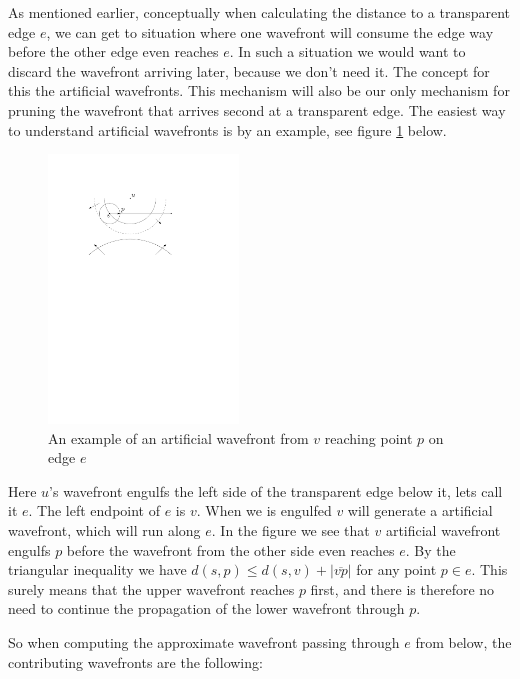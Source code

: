 As mentioned earlier, conceptually when calculating the distance to a transparent edge $e$, we 
can get to situation where one wavefront will consume the edge way before the other edge even 
reaches $e$. In such a situation we would want to discard the wavefront arriving later, 
because we don't need it. The concept for this the artificial wavefronts. This mechanism will 
also be our only mechanism for pruning the wavefront that arrives second at a transparent 
edge. The easiest way to understand artificial wavefronts is by an example, see figure 
\ref{fig:artificialwavefront} below.

\begin{figure}[H]
	\centering
	\includegraphics[width=0.45\textwidth]{figures/artificialwavefront.pdf}
	\caption{An example of an artificial wavefront from $v$ reaching point $p$ on edge $e$}
	\label{fig:artificialwavefront}
\end{figure}

Here $u$'s wavefront engulfs the left side of the transparent edge below it, lets call it $e$. 
The left endpoint of $e$ is $v$. When we is engulfed $v$ will generate a artificial wavefront, 
which will run along $e$. In the figure we see that $v$ artificial wavefront engulfs $p$ 
before the wavefront from the other side even reaches $e$. By the triangular inequality we 
have $d(s,p) \leq d(s,v) + |\overline{vp}|$ for any point $p \in e$. This surely means that 
the upper wavefront reaches $p$ first, and there is therefore no need to continue the 
propagation of the lower wavefront through $p$.

So when computing the approximate wavefront passing through $e$ from below, the contributing 
wavefronts are the following:

